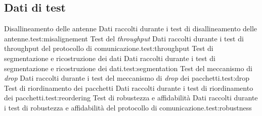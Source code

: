 \documentclass[12pt,a4paper,twoside]{book}
\begin{document}
\begin{appendices}
    \chapter{Dati di test} \label{app:test}
    \begin{enumerate}
        {Disallineamento delle antenne}%
        {Dati raccolti durante i test di disallineamento delle antenne.}{test:misalignement}
        {Test del \emph{throughput}}%
        {Dati raccolti durante i test di throughput del protocollo di comunicazione.}{test:throughput}
        {Test di segmentazione e ricostruzione dei dati}%
        {Dati raccolti durante i test di segmentazione e ricostruzione dei dati.}{test:segmentation}
        {Test del meccanismo di \emph{drop}}%
        {Dati raccolti durante i test del meccanismo di \emph{drop} dei pacchetti.}{test:drop}
        {Test di riordinamento dei pacchetti}%
        {Dati raccolti durante i test di riordinamento dei pacchetti.}{test:reordering}
        {Test di robustezza e affidabilità}%
        {Dati raccolti durante i test di robustezza e affidabilità del protocollo di comunicazione.}{test:robustness}
    \end{enumerate}

\end{appendices}
\end{document}

